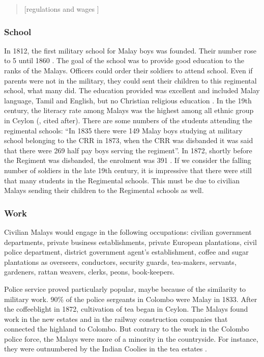 \begin{quote}
    [regulations and wages \citep[60]{Hussainmiya1987}]
\end{quote}

\subsubsection{School}\label{sec:slmbg:School}
In 1812, the first military school for Malay boys was founded. Their number rose to 5 until 1860 \citep[99]{Hussainmiya1990}. The goal of the school was to provide good education to the ranks of the Malays. \kuckn Officers could order their soldiers to attend school. Even if parents were not in the military, they could sent their children to this regimental school, what many did. The education provided was excellent and included Malay language, Tamil and English, but no Christian religious education  \citep[96]{Hussainmiya1990}. In the 19th century, the literacy rate among Malays was the highest among all ethnic group in Ceylon (\citet[48]{Marga1988}, cited after\citet[17]{Bichsel}). There are some numbers of the students attending the regimental schools:
    ``In 1835 there were 149 Malay boys studying at military school belonging to the CRR \el in 1873, when the CRR was disbanded it was said that there were 269 half pay boys serving the regiment''\citep[97]{Hussainmiya1990}. In 1872, shortly before the Regiment was disbanded, the enrolment was 391 \citep[17]{Bichsel}. If we consider the falling number of soldiers in the late 19th century, it is impressive that there were still that many students in the Regimental schools. This must be due to civilian Malays sending their children to the Regimental schools as well.

\subsubsection{Work}\label{sec:slmbg:Work}
Civilian Malays would engage in the following occupations:
      civilian government departments,
      private business establishments,
      private European plantations,
      civil police department,
      district government agent's establishment,
      coffee and sugar plantations as overseers, conductors, security guards, tea-makers,
      servants,
      gardeners,
      rattan weavers,
      clerks,
      peons,
      book-keepers.

Police service proved particularly popular, maybe because of the
similarity to military work. 90\% of the police sergeants in
Colombo were Malay in 1833. After the coffeeblight in 1872,
cultivation of tea began in Ceylon. The Malays found work in the
new estates and in the railway construction companies that
connected the highland to Colombo. But contrary to the work in the
Colombo police force, the Malays were more of a minority in the
countryside. For instance, they were outnumbered by the Indian
Coolies in the tea estates \citep[90f]{Hussainmiya1990}.

